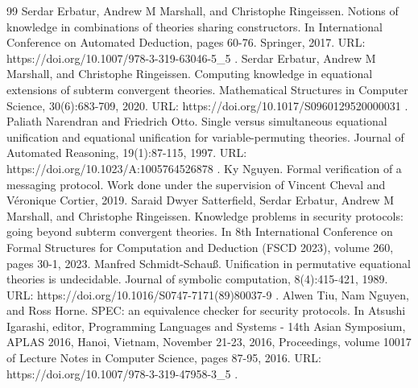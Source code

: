 \documentclass[10pt,a4paper]{amsart}
\begin{document}
\begin{thebibliography}{99}
 Serdar Erbatur, Andrew M Marshall, and Christophe Ringeissen. Notions of knowledge in combinations of theories sharing constructors. In International Conference on Automated Deduction, pages 60-76. Springer, 2017. URL: https://doi.org/10.1007/978-3-319-63046-5\_5 .
 Serdar Erbatur, Andrew M Marshall, and Christophe Ringeissen. Computing knowledge in equational extensions of subterm convergent theories. Mathematical Structures in Computer Science, 30(6):683-709, 2020. URL: https://doi.org/10.1017/S0960129520000031 .
 Paliath Narendran and Friedrich Otto. Single versus simultaneous equational unification and equational unification for variable-permuting theories. Journal of Automated Reasoning, 19(1):87-115, 1997. URL: https://doi.org/10.1023/A:1005764526878 .
 Ky Nguyen. Formal verification of a messaging protocol. Work done under the supervision of Vincent Cheval and Véronique Cortier, 2019.
 Saraid Dwyer Satterfield, Serdar Erbatur, Andrew M Marshall, and Christophe Ringeissen. Knowledge problems in security protocols: going beyond subterm convergent theories. In 8th International Conference on Formal Structures for Computation and Deduction (FSCD 2023), volume 260, pages 30-1, 2023.
 Manfred Schmidt-Schauß. Unification in permutative equational theories is undecidable. Journal of symbolic computation, 8(4):415-421, 1989. URL: https://doi.org/10.1016/S0747-7171(89)80037-9 .
 Alwen Tiu, Nam Nguyen, and Ross Horne. SPEC: an equivalence checker for security protocols. In Atsushi Igarashi, editor, Programming Languages and Systems - 14th Asian Symposium, APLAS 2016, Hanoi, Vietnam, November 21-23, 2016, Proceedings, volume 10017 of Lecture Notes in Computer Science, pages 87-95, 2016. URL: https://doi.org/10.1007/978-3-319-47958-3\_5 .
\end{thebibliography}
\end{document}
